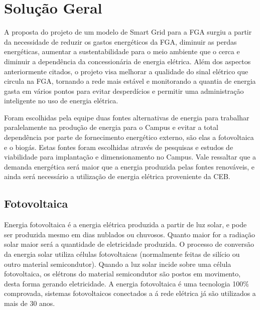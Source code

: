 \chapter[Solução Geral]{Solução Geral}

A proposta do projeto de um modelo de Smart Grid para a FGA surgiu a partir da necessidade de reduzir os gastos energéticos da FGA, diminuir as perdas energéticas, aumentar a sustentabilidade para o meio ambiente que o cerca e diminuir a dependência da concessionária de energia elétrica. Além dos aspectos anteriormente citados, o projeto visa melhorar a qualidade do sinal elétrico que circula na FGA, tornando a rede mais estável e monitorando a quantia de energia gasta em vários pontos para evitar desperdícios e permitir uma administração inteligente no uso de energia elétrica.

Foram escolhidas pela equipe duas fontes alternativas de energia para trabalhar paralelamente na produção de energia para o Campus e evitar a total dependência por parte de fornecimento energético externo, são elas a fotovoltaica e o biogás. Estas fontes foram escolhidas através de pesquisas e estudos de viabilidade para implantação e dimensionamento no Campus. Vale ressaltar que a demanda energética será maior que a energia produzida pelas fontes renováveis, e ainda será necessário a utilização de energia elétrica proveniente da CEB.

\section{Fotovoltaica}
Energia fotovoltaica é a energia elétrica produzida a partir de luz solar, e pode ser produzida mesmo em dias nublados ou chuvosos. Quanto maior for a radiação solar maior será a quantidade de eletricidade produzida. O processo de conversão da energia solar utiliza células fotovoltaicas (normalmente feitas de silício ou outro material semicondutor). Quando a luz solar incide sobre uma célula fotovoltaica, os elétrons do material semicondutor são postos em movimento, desta forma gerando eletricidade. A energia fotovoltaica é uma tecnologia 100\% comprovada, sistemas fotovoltaicos conectados a á rede elétrica já são utilizados a mais de 30 anos.

